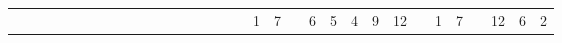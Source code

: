 \documentclass[20pt]{extarticle}
\begin{document}
  \begin{tabular}{ p{2em} cc p{2em} ccccc p{2em} cc p{2em} ccc}
  &\underline{\hspace{1em}}&\underline{\hspace{1em}}&&\underline{\hspace{1em}}&\underline{\hspace{1em}}&\underline{\hspace{1em}}&\underline{\hspace{1em}}&\underline{\hspace{1em}}&&\underline{\hspace{1em}}&\underline{\hspace{1em}}&&\underline{\hspace{1em}}&\underline{\hspace{1em}}&\underline{\hspace{1em}}&
   &1&7& &6&5&4&9&12& &1&7& &12&6&2&
\end{tabular}

\\
\end{document}
